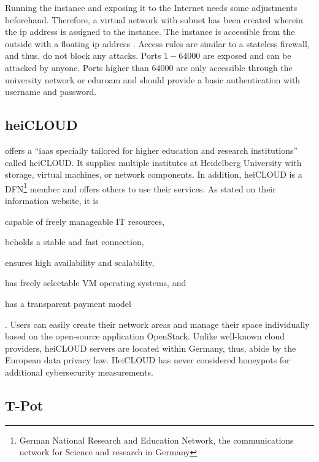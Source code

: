 Running the instance and exposing it to the Internet needs some adjustments beforehand.
Therefore, a virtual network with subnet  has been created wherein the \ac{ip} address  is assigned to the instance.
The instance is accessible from the outside with a floating \ac{ip} address .
Access rules are similar to a stateless firewall, and thus, do not block any attacks.
Ports $1-64000$ are exposed and can be attacked by anyone.
Ports higher than $64000$ are only accessible through the university network  or eduroam  and should provide a basic authentication with username and password.

\subsection{heiCLOUD}
\label{subsec:heicloud}

\citet{urz2021} offers a \enquote{\ac{iaas} specially tailored for higher education and research institutions} called heiCLOUD.
It supplies multiple institutes at Heidelberg University with storage, virtual machines, or network components.
In addition, heiCLOUD is a DFN\footnote{German National Research and Education Network, the communications network for Science and research in Germany} member and offers others to use their services.
As stated on their information website\cite{heicloud2021}, it is
\begin{enumerate*}[label=(\roman*)]
    \item capable of freely manageable IT resources,
    \item beholds a stable and fast connection,
    \item ensures high availability and scalability,
    \item has freely selectable VM operating systems, and
    \item has a transparent payment model
\end{enumerate*} \cite{heicloud2021}.
Users can easily create their network areas and manage their space individually based on the open-source application OpenStack.
Unlike well-known cloud providers, heiCLOUD servers are located within Germany, thus, abide by the European data privacy law.
HeiCLOUD has never considered honeypots for additional cybersecurity measurements.

\subsection{T-Pot}
\label{subsec:tpot}

